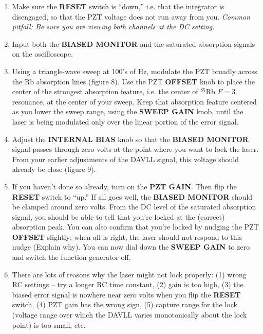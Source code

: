 \documentclass{../lab}
\begin{document}
\begin{enumerate}
    \item Make sure the \textbf{RESET} switch is ``down,'' i.e. that the integrator is disengaged, so that the PZT voltage does not run away from you. \emph{Common pitfall: Be sure you are viewing both channels at the DC setting.}

    \item Input both the \textbf{BIASED MONITOR} and the saturated-absorption signals on the oscilloscope.

    \item Using a triangle-wave sweep at 100's of Hz, modulate the PZT broadly across the Rb absorption lines (figure 8). Use the PZT \textbf{OFFSET} knob to place the center of the strongest absorption feature, i.e. the center of $^{85}$Rb $F=3 $ resonance, at the center of your sweep. Keep that absorption feature centered as you lower the sweep range, using the \textbf{SWEEP GAIN} knob, until the laser is being modulated only over the linear portion of the error signal.

    \item Adjust the \textbf{INTERNAL BIAS} knob so that the \textbf{BIASED MONITOR} signal passes through zero volts at the point where you want to lock the laser. From your earlier adjustments of the DAVLL signal, this voltage should already be close (figure 9).

    \item If you haven't done so already, turn on the \textbf{PZT GAIN}. Then flip the \textbf{RESET} switch to ``up.'' If all goes well, the \textbf{BIASED MONITOR} should be clamped around zero volts. From the DC level of the saturated absorption signal, you should be able to tell that you're locked at the (correct) absorption peak. You can also confirm that you're locked by nudging the PZT \textbf{OFFSET} slightly; when all is right, the laser should not respond to this nudge (Explain why). You can now dial down the \textbf{SWEEP GAIN} to zero and switch the function generator off.

    \item There are lots of reasons why the laser might not lock properly: (1) wrong RC settings -- try a longer RC time constant, (2) gain is too high, (3) the biased error signal is nowhere near zero volts when you flip the \textbf{RESET} switch, (4) PZT gain has the wrong sign, (5) capture range for the lock (voltage range over which the DAVLL varies monotonically about the lock point) is too small, etc.
\end{enumerate}
\end{document}
